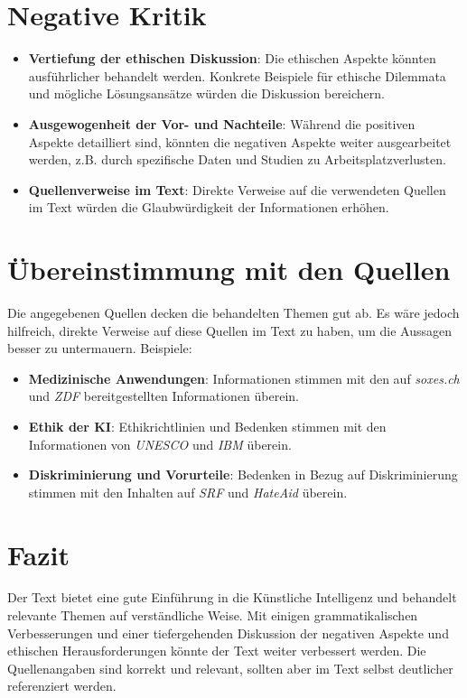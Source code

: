\documentclass{article}
\begin{document}
\section*{Negative Kritik}
\begin{itemize}
    \item \textbf{Vertiefung der ethischen Diskussion}: Die ethischen Aspekte könnten ausführlicher behandelt werden. Konkrete Beispiele für ethische Dilemmata und mögliche Lösungsansätze würden die Diskussion bereichern.
    \item \textbf{Ausgewogenheit der Vor- und Nachteile}: Während die positiven Aspekte detailliert sind, könnten die negativen Aspekte weiter ausgearbeitet werden, z.B. durch spezifische Daten und Studien zu Arbeitsplatzverlusten.
    \item \textbf{Quellenverweise im Text}: Direkte Verweise auf die verwendeten Quellen im Text würden die Glaubwürdigkeit der Informationen erhöhen.
\end{itemize}

\section*{Übereinstimmung mit den Quellen}
Die angegebenen Quellen decken die behandelten Themen gut ab. Es wäre jedoch hilfreich, direkte Verweise auf diese Quellen im Text zu haben, um die Aussagen besser zu untermauern. Beispiele:
\begin{itemize}
    \item \textbf{Medizinische Anwendungen}: Informationen stimmen mit den auf \textit{soxes.ch} und \textit{ZDF} bereitgestellten Informationen überein.
    \item \textbf{Ethik der KI}: Ethikrichtlinien und Bedenken stimmen mit den Informationen von \textit{UNESCO} und \textit{IBM} überein.
    \item \textbf{Diskriminierung und Vorurteile}: Bedenken in Bezug auf Diskriminierung stimmen mit den Inhalten auf \textit{SRF} und \textit{HateAid} überein.
\end{itemize}

\section*{Fazit}
Der Text bietet eine gute Einführung in die Künstliche Intelligenz und behandelt relevante Themen auf verständliche Weise. Mit einigen grammatikalischen Verbesserungen und einer tiefergehenden Diskussion der negativen Aspekte und ethischen Herausforderungen könnte der Text weiter verbessert werden. Die Quellenangaben sind korrekt und relevant, sollten aber im Text selbst deutlicher referenziert werden.
\end{document}
